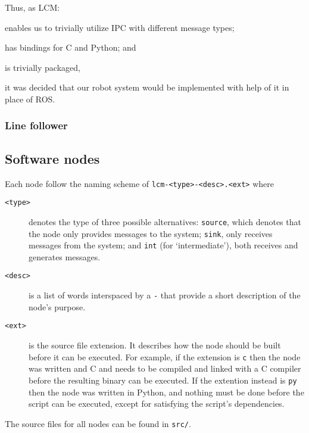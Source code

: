 Thus, as LCM:
\begin{inline-enum}
\item enables us to trivially utilize IPC with different message types;
\item has bindings for C and Python; and
\item is trivially packaged,
\end{inline-enum}
it was decided that our robot system would be implemented with help of it in place of ROS.

\subsubsection{Line follower}

\subsection{Software nodes}
Each node follow the naming scheme of \texttt{lcm-<type>-<desc>.<ext>} where
\begin{description}
\item[\texttt{<type>}] denotes the type of three possible alternatives:
  \texttt{source}, which denotes that the node only provides messages to the system;
  \texttt{sink}, only receives messages from the system; and
  \texttt{int} (for `intermediate'), both receives and generates messages.
\item[\texttt{<desc>}] is a list of words interspaced by a \texttt{-} that provide a short description of the node's purpose.
\item[\texttt{<ext>}] is the source file extension. It describes how the node should be built before it can be executed.
  For example, if the extension is \texttt{c} then the node was written and C and needs to be compiled and linked with a C compiler before the resulting binary can be executed.
  If the extention instead is \texttt{py} then the node was written in Python, and nothing must be done before the script can be executed,
  except for satisfying the script's dependencies.
\end{description}

The source files for all nodes can be found in \texttt{src/}.

